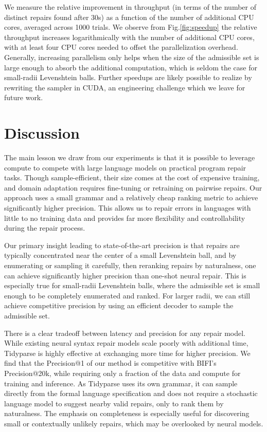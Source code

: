 \documentclass[runningheads]{llncs}
\begin{document}
  We measure the relative improvement in throughput (in terms of the number of distinct repairs found after 30s) as a function of the number of additional CPU cores, averaged across 1000 trials. We observe from Fig.\ref{fig:speedup} the relative throughput increases logarithmically with the number of additional CPU cores, with at least four CPU cores needed to offset the parallelization overhead. Generally, increasing parallelism only helps when the size of the admissible set is large enough to absorb the additional computation, which is seldom the case for small-radii Levenshtein balls. Further speedups are likely possible to realize by rewriting the sampler in CUDA, an engineering challenge which we leave for future work.

  \section{Discussion}\label{sec:discussion}

  The main lesson we draw from our experiments is that it is possible to leverage compute to compete with large language models on practical program repair tasks. Though sample-efficient, their size comes at the cost of expensive training, and domain adaptation requires fine-tuning or retraining on pairwise repairs. Our approach uses a small grammar and a relatively cheap ranking metric to achieve significantly higher precision. This allows us to repair errors in languages with little to no training data and provides far more flexibility and controllability during the repair process.

  Our primary insight leading to state-of-the-art precision is that repairs are typically concentrated near the center of a small Levenshtein ball, and by enumerating or sampling it carefully, then reranking repairs by naturalness, one can achieve significantly higher precision than one-shot neural repair. This is especially true for small-radii Levenshtein balls, where the admissible set is small enough to be completely enumerated and ranked. For larger radii, we can still achieve competitive precision by using an efficient decoder to sample the admissible set.

  There is a clear tradeoff between latency and precision for any repair model. While existing neural syntax repair models scale poorly with additional time, Tidyparse is highly effective at exchanging more time for higher precision. We find that the Precision@1 of our method is competitive with BIFI's Precision@20k, while requiring only a fraction of the data and compute for training and inference. As Tidyparse uses its own grammar, it can sample directly from the formal language specification and does not require a stochastic language model to suggest nearby valid repairs, only to rank them by naturalness. The emphasis on completeness is especially useful for discovering small or contextually unlikely repairs, which may be overlooked by neural models.
\end{document}
